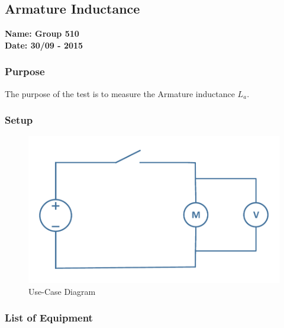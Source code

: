 \pagebreak
\subsection{Armature Inductance}%
\textbf{Name: Group 510}\\
\textbf{Date: 30/09 - 2015}

\subsubsection{Purpose}
The purpose of the test is to measure the Armature inductance $L_a$.

\subsubsection{Setup}
\begin{figure}[H]
  \centering
	\includegraphics[scale=0.5]{figures/MotorTest2.pdf}
	\caption{Use-Case Diagram}
\end{figure}

\subsubsection{List of Equipment}

